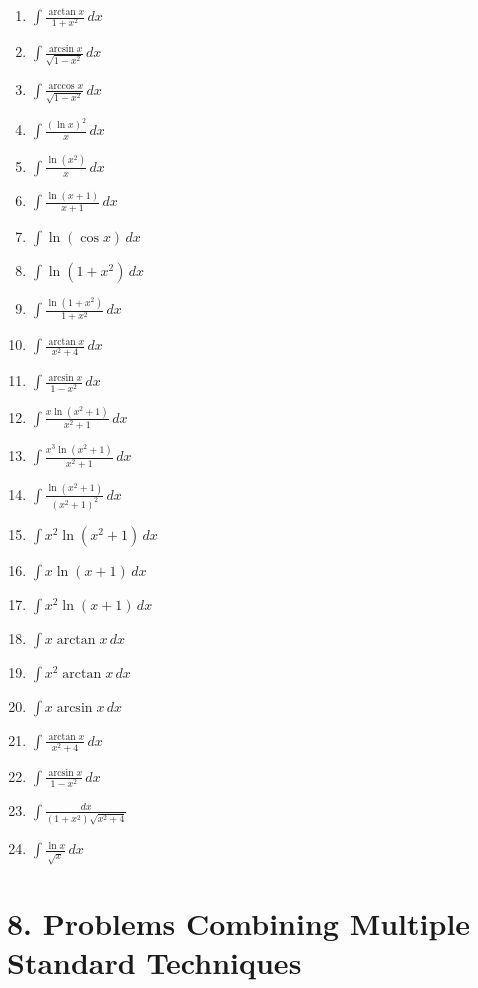 \documentclass[11pt]{article}
\begin{document}
\begin{enumerate}
\item $\displaystyle \int \frac{\arctan x}{1+x^2}\,dx$
\item $\displaystyle \int \frac{\arcsin x}{\sqrt{1-x^2}}\,dx$
\item $\displaystyle \int \frac{\arccos x}{\sqrt{1-x^2}}\,dx$
\item $\displaystyle \int \frac{(\ln x)^2}{x}\,dx$
\item $\displaystyle \int \frac{\ln(x^2)}{x}\,dx$
\item $\displaystyle \int \frac{\ln(x+1)}{x+1}\,dx$
\item $\displaystyle \int \ln(\cos x)\,dx$
\item $\displaystyle \int \ln(1+x^2)\,dx$
\item $\displaystyle \int \frac{\ln(1+x^2)}{1+x^2}\,dx$
\item $\displaystyle \int \frac{\arctan x}{x^2+4}\,dx$
\item $\displaystyle \int \frac{\arcsin x}{1-x^2}\,dx$
\item $\displaystyle \int \frac{x\ln(x^2+1)}{x^2+1}\,dx$
\item $\displaystyle \int \frac{x^3\ln(x^2+1)}{x^2+1}\,dx$
\item $\displaystyle \int \frac{\ln(x^2+1)}{(x^2+1)^2}\,dx$
\item $\displaystyle \int x^2\ln(x^2+1)\,dx$
\item $\displaystyle \int x\ln(x+1)\,dx$
\item $\displaystyle \int x^2\ln(x+1)\,dx$
\item $\displaystyle \int x\arctan x\,dx$
\item $\displaystyle \int x^2\arctan x\,dx$
\item $\displaystyle \int x\arcsin x\,dx$
\item $\displaystyle \int \frac{\arctan x}{x^2+4}\,dx$
\item $\displaystyle \int \frac{\arcsin x}{1-x^2}\,dx$
\item $\displaystyle \int \frac{dx}{(1+x^2)\sqrt{x^2+4}}$
\item $\displaystyle \int \frac{\ln x}{\sqrt{x}}\,dx$
\end{enumerate}

\section*{8. Problems Combining Multiple Standard Techniques}
\end{document}
